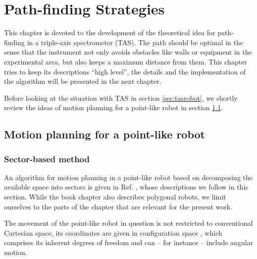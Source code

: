%
%

\chapter{Path-finding Strategies}
\label{ch:paths}

This chapter is devoted to the development of the theoretical idea for path-finding in a triple-axis spectrometer (TAS).
The path should be optimal in the sense that the instrument not only avoids obstacles like walls or equipment in the experimental area,
but also keeps a maximum distance from them. This chapter tries to keep its descriptions ``high level'', the details
and the implementation of the algorithm will be presented in the next chapter.

Before looking at the situation with TAS in section \ref{sec:tasrobot}, we shortly review the ideas of motion planning for a 
point-like robot in section \ref{sec:pointrobot}.



\section{Motion planning for a point-like robot}
\label{sec:pointrobot}

\subsection*{Sector-based method}
An algorithm for motion planning in a point-like robot based on decomposing the available space into sectors is 
given in Ref. \cite[Ch. 13, pp. 283-306]{Berg2008}, whose descriptions we follow in this section. 
While the book chapter also describes polygonal robots, we limit ourselves to the parts of the chapter 
that are relevant for the present work.

The movement of the point-like robot in question is not restricted to conventional Cartesian space, its coordinates are given in configuration
space  \cite[Ch. 13.1, pp. 284-286]{Berg2008}, which comprises its inherent degrees of freedom and can -- for instance -- include angular motion.


